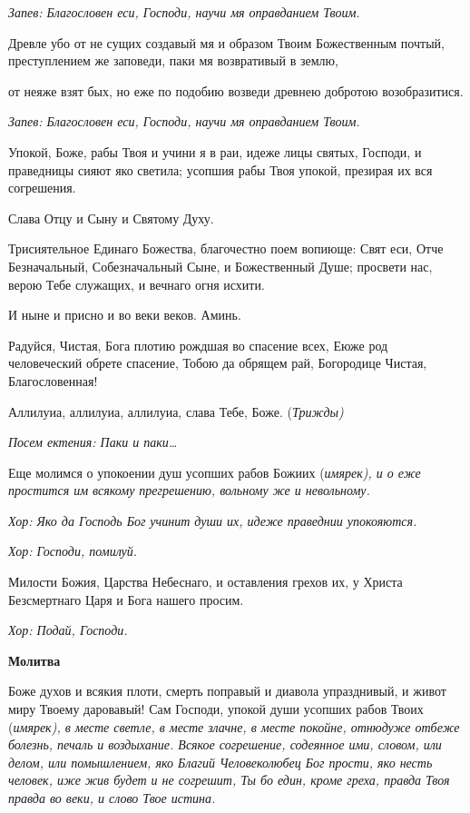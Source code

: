  \itshape Запев:\normalfont{} Благословен еси, Господи, научи мя оправданием Твоим.


   Древле убо от не сущих создавый мя и образом Твоим Божественным
почтый, преступлением же заповеди, паки мя возвративый в землю,

от неяже взят бых, но еже по подобию возведи древнею добротою
возобразитися.


 \itshape Запев:\normalfont{} Благословен еси, Господи, научи мя оправданием Твоим.


   Упокой, Боже, рабы Твоя и учини я в раи, идеже лицы святых, Господи,
и праведницы сияют яко светила; усопшия рабы Твоя упокой, презирая их
вся согрешения.


   Слава Отцу и Сыну и Святому Духу.


   Трисиятельное Единаго Божества, благочестно поем вопиюще: Свят еси,
Отче Безначальный, Собезначальный Сыне, и Божественный Душе; просвети
нас, верою Тебе служащих, и вечнаго огня исхити.


   И ныне и присно и во веки веков. Аминь.


   Радуйся, Чистая, Бога плотию рождшая во спасение всех, Еюже род
человеческий обрете спасение, Тобою да обрящем рай, Богородице Чистая,
Благословенная!


   Аллилуиа, аллилуиа, аллилуиа, слава Тебе, Боже. (\itshape  Трижды\normalfont{})


 \itshape  Посем ектения:\normalfont{} Паки и паки…


   Еще молимся о упокоении душ усопших рабов Божиих (\itshape  имярек\normalfont{}), и о еже
простится им всякому прегрешению, вольному же и невольному.


 \itshape  Хор:\normalfont{} Яко да Господь Бог учинит души их, идеже праведнии упокояются.


 \itshape  Хор:\normalfont{} Господи, помилуй.


   Милости Божия, Царства Небеснаго, и оставления грехов их, у Христа
Безсмертнаго Царя и Бога нашего просим.


 \itshape  Хор:\normalfont{} Подай, Господи.


 

\bfseries Молитва\normalfont{}

   Боже духов и всякия плоти, смерть поправый и диавола упразднивый, и
живот миру Твоему даровавый! Сам Господи, упокой души усопших рабов
Твоих (\itshape  имярек\normalfont{}), в месте светле, в месте злачне, в месте покойне,
отнюдуже отбеже болезнь, печаль и воздыхание. Всякое согрешение,
содеянное ими, словом, или делом, или помышлением, яко Благий
Человеколюбец Бог прости, яко несть человек, иже жив будет и не согрешит,
Ты бо един, кроме греха, правда Твоя правда во веки, и слово Твое
истина.


